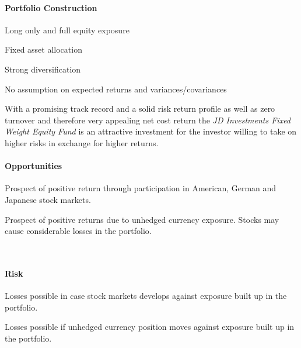 \documentclass[11pt, parskip=full, DIV=14, headings=small, footsepline, footinclude=false, headsepline]{scrreprt}
\begin{document}
\begin{minipage}{0.5\textwidth}
\paragraph{Portfolio Construction}
\begin{sit}
\item	Long only and full equity exposure
\item	Fixed asset allocation
\item	Strong diversification
\item	No assumption on expected returns and variances/covariances
\end{sit}
\end{minipage}
\begin{minipage}{0.5\textwidth}
\end{minipage}


With a promising track record and a solid risk return profile as well as zero turnover and therefore very appealing net cost return the \textit{JD Investments Fixed Weight Equity Fund} is an attractive investment for the investor willing to take on higher risks in exchange for higher returns. 

\begin{minipage}[t]{0.49\textwidth}
  \paragraph{Opportunities}
  \begin{sit}
  \item Prospect of positive return through participation in American, German and Japanese stock markets.
  \item Prospect of positive returns due to unhedged currency exposure. Stocks may cause considerable losses in the portfolio.
  \end{sit}
\end{minipage}
~~
\begin{minipage}[t]{0.49\textwidth}
  \paragraph{Risk}
  \begin{sit}
  \item Losses possible in case stock markets develops against exposure built up in the portfolio.
  \item Losses possible if unhedged currency position moves against exposure built up in the portfolio.
  \end{sit}
\end{minipage}
\end{document}
